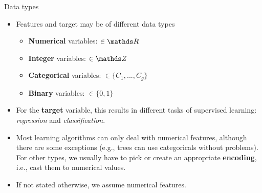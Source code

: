 \documentclass[11pt,compress,t,notes=noshow, xcolor=table]{beamer}
\begin{document}
\begin{vbframe}{Data types}

\begin{itemize}

  \item Features and target may be of different data types 
  
  \begin{itemize}
  
    \item \textbf{Numerical} variables: 
    $\in \R$
    
    \item \textbf{Integer} variables:  $\in \Z$
    
    \item \textbf{Categorical} variables: $\in \{C_1,...,C_g\}$
    
    \item \textbf{Binary} variables:   $\in \{0, 1\}$
  
  \end{itemize}
  
  \item For the \textbf{target} variable, this results in different tasks of supervised learning: \textit{regression} and \textit{classification}. 
  
  \item Most learning algorithms can only deal with numerical features,
      although there are some exceptions (e.g., trees can use categoricals without problems).
      For other types, we usually have to pick or create an
      appropriate \textbf{encoding}, i.e., cast them to numerical values.
  \item If not stated otherwise, we assume numerical features.

\end{itemize}

\end{vbframe}


\end{document}
